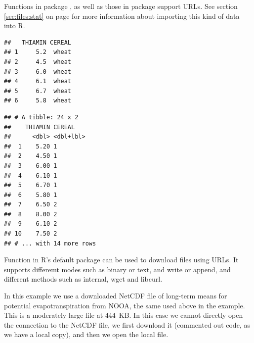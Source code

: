 \documentclass[krantz2,ChapterTOCs]{krantz}\usepackage{knitr}
\begin{document}
Functions in package , as well as those in package  support URLs. See section \ref{sec:files:stat} on page \pageref{sec:files:stat} for more information about importing this kind of data into R.

\begin{knitrout}\footnotesize
{}\color{fgcolor}\begin{kframe}
\begin{alltt}
 \hlkwb{<-}
  \hlstd{(} \hlstd{=} \hlstd{,}
             \hlstd{=} \hlstd{)}
\end{alltt}
\begin{verbatim}
##   THIAMIN CEREAL
## 1     5.2  wheat
## 2     4.5  wheat
## 3     6.0  wheat
## 4     6.1  wheat
## 5     6.7  wheat
## 6     5.8  wheat
\end{verbatim}
\end{kframe}
\end{knitrout}

\begin{knitrout}\footnotesize
{}\color{fgcolor}\begin{kframe}
\begin{alltt}
 \hlkwb{<-}
    \hlstd{(} \hlstd{=} \hlstd{)}
\end{alltt}
\begin{verbatim}
## # A tibble: 24 x 2
##    THIAMIN CEREAL   
##      <dbl> <dbl+lbl>
##  1    5.20 1        
##  2    4.50 1        
##  3    6.00 1        
##  4    6.10 1        
##  5    6.70 1        
##  6    5.80 1        
##  7    6.50 2        
##  8    8.00 2        
##  9    6.10 2        
## 10    7.50 2        
## # ... with 14 more rows
\end{verbatim}
\end{kframe}
\end{knitrout}

Function  in R's default  package can be used to download files using URLs. It supports differemt modes such as binary or text, and write or append, and different methods such as internal, wget and libcurl.

In this example we use a downloaded NetCDF file of long-term means for potential evapotranspiration from NOOA, the same used above in the  example. This is a moderately large file at 444~KB. In this case we cannot directly open the connection to the NetCDF file, we first download it (commented out code, as we have a local copy), and then we open the local file.
\end{document}
